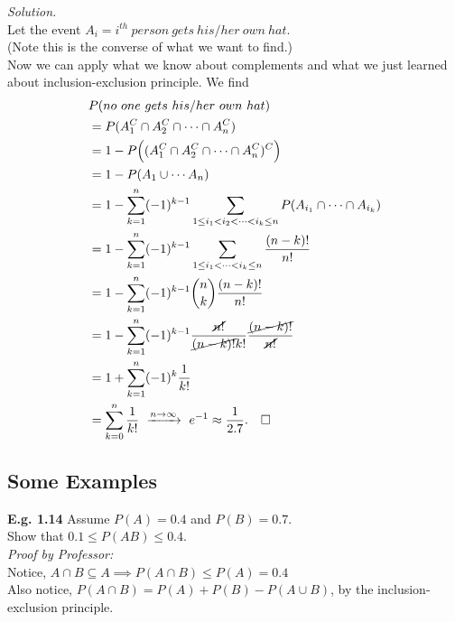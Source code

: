 \documentclass[12pt]{book}
\begin{document}
\noindent \textit{Solution.} \\
Let the event $A_{i} = i^{th}~person~gets~his/her~own~hat$. \\
(Note this is the converse of what we want to find.) \\

\noindent Now we can apply what we know about complements and what we just learned about inclusion-exclusion principle. We find 
\begin{align*}
&P(no~one~gets~his/her~own~hat)\\
&=P(A_{1}^{C} \cap A_{2}^{C} \cap \cdots \cap A_{n}^{C})\\
&=1- P\Big((A_{1}^{C} \cap A_{2}^{C} \cap \cdots\cap A_{n}^{C})^{C}\Big)\\
&= 1- P(A_{1}\cup \cdots A_{n}) \\
&= 1-\sum\limits_{k=1}^{n} (-1)^{k-1} \sum\limits_{1\leq i_{1} < i_{2} <\cdots <i_{k} \leq n }  P(A_{i_{1}} \cap \cdots \cap A_{i_{k}})\\
&= 1-\sum\limits_{k=1}^{n} (-1)^{k-1} \sum\limits_{1\leq i_{1} <\cdots <i_{k} \leq n }  \frac{(n-k)!}{n!}\\
&= 1- \sum\limits_{k=1}^{n} (-1)^{k-1} {n\choose k} \frac{(n-k)!}{n!}\\
&= 1-\sum\limits_{k=1}^{n} (-1)^{k-1} \frac{\cancel{n!}}{\cancel{(n-k)!}k!} \frac{\cancel{(n-k)!}}{\cancel{n!}} \\
&= 1+ \sum\limits_{k=1}^{n} (-1)^{k} \frac{1}{k!}\\
&= \sum\limits_{k=0}^{n} \frac{1}{k!} ~\xrightarrow{n\to \infty}~ e^{-1} \approx \frac{1}{2.7}.~~~\square 
\end{align*}
\newpage








\subsection{Some Examples}
\noindent \textbf{E.g. 1.14} Assume $P(A)=0.4$ and $P(B)=0.7$. \\Show that $0.1\leq P(AB) \leq 0.4$.\\

\noindent\textit{Proof by Professor:}\\
Notice, $A\cap B \subseteq A \implies P(A\cap B) \leq P(A)=0.4$\\
Also notice, $P(A\cap B)=P(A)+P(B)-P(A\cup B)$, by the inclusion-exclusion principle. \\
\end{document}
